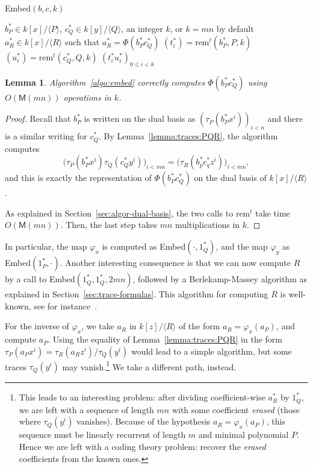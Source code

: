 \documentclass[12pt]{article}
\def\M {\ensuremath{\mathsf{M}}}
\def\rem {\ensuremath{\mathrm{rem}}}
\newcommand{\ang}[1]{\langle#1\rangle}
\newtheorem{Lemma}{Lemma}
\begin{document}
\begin{algorithm}[H]
  \caption{Embed$(b,c,k)$}
  \begin{algorithmic}[1]
    \REQUIRE $b_P^\ast\in k[x]/\ang{P}$, $c_Q^\ast\in k[y]/\ang{Q}$, an integer $k$, or $k=mn$ by default
    \ENSURE $a_R^\ast\in k[x]/\ang{R}$ such that $a_R^\ast=\Phi(b_P^\ast c_Q^\ast)$
    \STATE $(t_i^\ast) = \rem^t(b_P^\ast,P,k)$
    \STATE $(u_i^\ast) = \rem^t(c_Q^\ast,Q,k)$
    \RETURN $(t_i^\ast u_i^\ast)_{0 \le i < k}$
  \end{algorithmic}
  \label{algo:embed}
\end{algorithm}

\begin{Lemma}\label{lemma:algo:embed}
  Algorithm~\ref{algo:embed} correctly computes $\Phi(b_P^\ast
  c_Q^\ast)$ using $O(\M(mn))$ operations in $k$.
\end{Lemma}
\begin{proof}
  Recall that $b_P^\ast$ is written on the dual basis as
  $(\tau_P(b_P^\ast x^i))_{i<n}$ and there is a similar writing for
  $c_Q^\ast$. By Lemma~\ref{lemma:traces:PQR}, the algorithm
  computes $$\bigl(\tau_P(b_P^\ast x^i)\tau_Q(c_Q^\ast
  y^i)\bigr)_{i<mn} = \bigl(\tau_R(b_p^\ast c_q^\ast
  z^i)\bigr)_{i<mn},$$ and this is exactly the representation of
  $\Phi(b_P^\ast c_Q^\ast)$ on the dual basis of $k[x]/\ang{R}$.

  As explained in Section~\ref{sec:algor-dual-basis}, the two calls to
  $\rem^t$ take time $O(\M(mn))$. Then, the last step takes $mn$
  multiplications in $k$.
\end{proof}

In particular, the map $\varphi_x$ is computed as
Embed$(\cdot,1_Q^\ast)$, and the map $\varphi_y$ as
Embed$(1_P^\ast,\cdot)$. Another interesting consequence is that we
can now compute $R$ by a call to Embed$(1_Q^\ast,1_Q^\ast,2mn)$,
followed by a Berlekamp-Massey algorithm as explained in
Section~\ref{sec:trace-formulas}. This algorithm for computing $R$ is
well-known, see for instance~\cite{BoFlSaSc06}.


For the inverse of $\varphi_x$, we take $a_R$ in $k[z]/\langle R
\rangle$ of the form $a_R=\varphi_x(a_P)$, and compute $a_P$. Using
the equality of Lemma~\ref{lemma:traces:PQR} in the form $\tau_P(a_P
x^i) =\tau_R(a_R z^i)/\tau_Q(y^i)$ would lead to a simple algorithm,
but some traces $\tau_Q(y^i)$ may vanish.\footnote{This leads to an
  interesting problem: after dividing coefficient-wise $a_R^\ast$ by
  $1_Q^\ast$, we are left with a sequence of length $mn$ with some
  coefficient \emph{erased} (those where $\tau_Q(y^i)$
  vanishes). Because of the hypothesis $a_R=\varphi_x(a_P)$, this
  sequence must be linearly recurrent of length $m$ and minimal
  polynomial $P$. Hence we are left with a coding theory problem:
  recover the \emph{erased} coefficients from the known ones.}  We
take a different path, instead.
\end{document}

